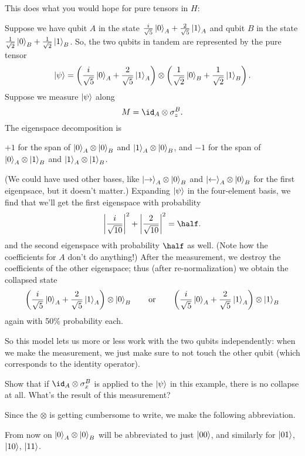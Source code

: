 \documentclass[11pt]{scrreprt}
\begin{document}
This does what you would hope for pure tensors in $H$:
\begin{example}
	Suppose we have qubit $A$ in the state
	$\frac{i}{\sqrt5}\ket0_A + \frac{2}{\sqrt5}\ket1_A$
	and qubit $B$ in the state
	$\frac{1}{\sqrt2} \ket0_B + \frac{1}{\sqrt2}\ket1_B$.
	So, the two qubits in tandem are represented by the pure tensor
	\[
		\ket\psi
		=
		\left( \frac{i}{\sqrt5}\ket0_A + \frac{2}{\sqrt5}\ket1_A \right)
		\otimes
		\left( \frac{1}{\sqrt2} \ket0_B + \frac{1}{\sqrt2}\ket1_B \right).
	\]
	Suppose we measure $\ket\psi$ along 
	\[ M = \id_A \otimes \sigma_z^B. \]
	The eigenspace decomposition is
	\begin{itemize}
		\ii $+1$ for the span of $\ket0_A \otimes \ket0_B$ and
		$\ket1_A \otimes \ket0_B$, and
		\ii $-1$ for the span of $\ket0_A \otimes \ket1_B$ and
		$\ket1_A \otimes \ket1_B$.
	\end{itemize}
	(We could have used other bases, like $\ket\rightarrow_A \otimes \ket0_B$ and
	$\ket\leftarrow_A \otimes \ket0_B$ for the first eigenpsace, but it doesn't matter.)
	Expanding $\ket\psi$ in the four-element basis, we find that
	we'll get the first eigenspace with probability
	\[ \left|\frac{i}{\sqrt{10}}\right|^2
	+ \left|\frac{2}{\sqrt{10}}\right|^2 = \half. \]
	and the second eigenspace with probability $\half$ as well.
	(Note how the coefficients for $A$ don't do anything!)
	After the measurement, we destroy the coefficients of the other eigenspace;
	thus (after re-normalization) we obtain the collapsed state
	\[ \left( \frac{i}{\sqrt5}\ket0_A + \frac{2}{\sqrt5}\ket1_A \right)
		\otimes \ket0_B
		\qquad\text{or}\qquad
		\left( \frac{i}{\sqrt5}\ket0_A + \frac{2}{\sqrt5}\ket1_A \right)
		\otimes \ket1_B
	\]
	again with 50\% probability each.
\end{example}
So this model lets us more or less work with the two qubits independently:
when we make the measurement, we just make sure to not touch the other qubit
(which corresponds to the identity operator).

\begin{exercise}
	Show that if $\id_A \otimes \sigma_x^B$ is applied to the $\ket\psi$
	in this example, there is no collapse at all.
	What's the result of this measurement?
\end{exercise}

Since the $\otimes$ is getting cumbersome to write,
we make the following abbreviation.
\begin{abuse}
	From now on $\ket 0_A \otimes \ket 0_B$ will be abbreviated
	to just $\ket{00}$, and similarly for $\ket{01}$, $\ket{10}$, $\ket{11}$.
\end{abuse}
\end{document}
